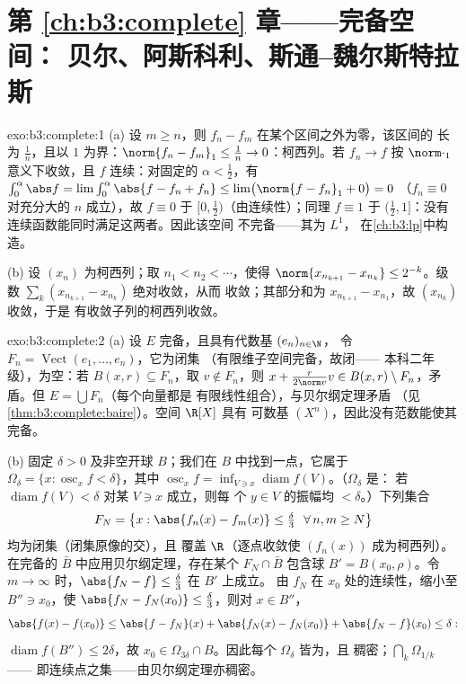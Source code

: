 \section*{第 \ref{ch:b3:complete} 章——完备空间：
贝尔、阿斯科利、斯通--魏尔斯特拉斯}

\begin{solution}{exo:b3:complete:1}
(a) 设 $m \geq n$，则 $f_n - f_m$ 在某个区间之外为零，该区间的
长为 $\frac1n$，且以 $1$ 为界：$\norm{f_n - f_m}_1
\leq \frac1n \to 0$：柯西列。若 $f_n \to f$ 按
$\norm\cdot_1$ 意义下收敛，且 $f$ 连续：对固定的 $\alpha <
\frac12$，有 $\int_0^{\alpha}\abs f = \lim \int_0^\alpha\abs{f -
f_n + f_n} \leq \lim\bigl(\norm{f - f_n}_1 + 0\bigr) = 0$
（$f_n \equiv 0$ 对充分大的 $n$ 成立），故 $f \equiv 0$ 于
$[0, \frac12)$（由连续性）；同理 $f \equiv 1$ 于
$(\frac12, 1]$：没有连续函数能同时满足这两者。因此该空间
不完备——其为 $L^1$，
在\cref{ch:b3:lp}中构造。

(b) 设 $(x_n)$ 为柯西列；取 $n_1 < n_2 < \cdots$，使得
$\norm{x_{n_{k+1}} - x_{n_k}} \leq 2^{-k}$。级数
$\sum_k (x_{n_{k+1}} - x_{n_k})$ 绝对收敛，从而
收敛；其部分和为 $x_{n_{k+1}} - x_{n_1}$，故
$(x_{n_k})$ 收敛，于是
有收敛子列的柯西列收敛。
\end{solution}

\begin{solution}{exo:b3:complete:2}
(a) 设 $E$ 完备，且具有代数基 $(e_n)_{n\in\N}$，
令 $F_n = \operatorname{Vect}(e_1, \dots, e_n)$，它为闭集
（有限维子空间完备，故闭——
本科二年级），为空：若 $B(x, r) \subseteq F_n$，取
$v \notin F_n$，则 $x + \frac{r}{2\norm v}v \in B(x,r)
\setminus F_n$，矛盾。但 $E = \bigcup F_n$（每个向量都是
有限线性组合），与贝尔纲定理矛盾
（见\cref{thm:b3:complete:baire}）。空间 $\R[X]$ 具有
可数基 $(X^n)$，因此没有范数能使其完备。

(b) 固定 $\delta > 0$ 及非空开球 $B$；我们在
$B$ 中找到一点，它属于 $\Omega_\delta = \{x : \operatorname{osc}_xf <
\delta\}$，其中 $\operatorname{osc}_xf = \inf_{V \ni
x}\operatorname{diam} f(V)$。（$\Omega_\delta$ 是：
若 $\operatorname{diam}f(V) < \delta$ 对某 $V \ni x$ 成立，则每
个 $y \in V$ 的振幅均 $< \delta$。）下列集合
\[
F_N = \bigl\{x : \abs{f_n(x) - f_m(x)} \leq \tfrac\delta3\
\ \forall\, n, m \geq N \bigr\}
\]
均为闭集（闭集原像的交），且
覆盖 $\R$（逐点收敛使 $(f_n(x))$ 成为柯西列）。
在完备的 $\bar B$ 中应用贝尔纲定理，存在某个 $F_N \cap
\bar B$ 包含球 $B' = B(x_0, \rho)$。令 $m \to
\infty$ 时，$\abs{f_N - f} \leq \frac\delta3$ 在 $B'$ 上成立。
由 $f_N$ 在 $x_0$ 处的连续性，缩小至 $B'' \ni x_0$，使
$\abs{f_N - f_N(x_0)} \leq \frac\delta3$，则对 $x \in B''$，
\[
\abs{f(x) - f(x_0)} \leq \abs{f - f_N}(x) + \abs{f_N(x) -
f_N(x_0)} + \abs{f_N - f}(x_0) \leq \delta:
\]
$\operatorname{diam} f(B'') \leq 2\delta$，故 $x_0 \in
\Omega_{3\delta} \cap B$。因此每个 $\Omega_\delta$ 皆为，且
稠密；$\bigcap_k\Omega_{1/k}$——
即连续点之集——由贝尔纲定理亦稠密。
\end{solution}

